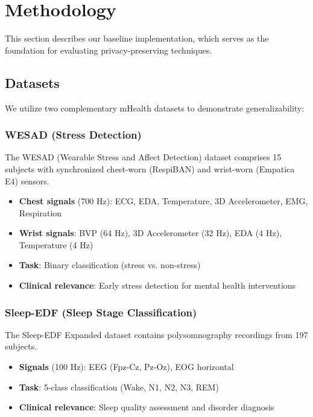\documentclass[conference]{IEEEtran}
\begin{document}
\section{Methodology}
\label{sec:methodology}

This section describes our baseline implementation, which serves as the foundation for evaluating privacy-preserving techniques.

\subsection{Datasets}

We utilize two complementary mHealth datasets to demonstrate generalizability:

\subsubsection{WESAD (Stress Detection)}

The WESAD (Wearable Stress and Affect Detection) dataset \cite{schmidt2018wesad} comprises 15 subjects with synchronized chest-worn (RespiBAN) and wrist-worn (Empatica E4) sensors.

\begin{itemize}
    \item \textbf{Chest signals} (700 Hz): ECG, EDA, Temperature, 3D Accelerometer, EMG, Respiration
    \item \textbf{Wrist signals}: BVP (64 Hz), 3D Accelerometer (32 Hz), EDA (4 Hz), Temperature (4 Hz)
    \item \textbf{Task}: Binary classification (stress vs. non-stress)
    \item \textbf{Clinical relevance}: Early stress detection for mental health interventions
\end{itemize}

\subsubsection{Sleep-EDF (Sleep Stage Classification)}

The Sleep-EDF Expanded dataset \cite{kemp2000analysis} contains polysomnography recordings from 197 subjects.

\begin{itemize}
    \item \textbf{Signals} (100 Hz): EEG (Fpz-Cz, Pz-Oz), EOG horizontal
    \item \textbf{Task}: 5-class classification (Wake, N1, N2, N3, REM)
    \item \textbf{Clinical relevance}: Sleep quality assessment and disorder diagnosis
\end{itemize}
\end{document}
